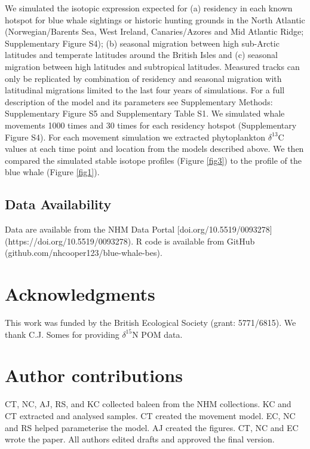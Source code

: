 \documentclass[a4paper,12pt]{article}
\begin{document}
We simulated the isotopic expression expected for (a) residency in each known hotspot for blue whale sightings or historic hunting grounds in the North Atlantic (Norwegian/Barents Sea, West Ireland, Canaries/Azores and Mid Atlantic Ridge\cite{mcdonald2006biogeographic,reilly2008balaenoptera,sigurjonsson1995life}; Supplementary Figure S4); (b) seasonal migration between high sub-Arctic latitudes and temperate latitudes around the British Isles and (c) seasonal migration between high latitudes and subtropical latitudes. 
Measured tracks can only be replicated by combination of residency and seasonal migration with latitudinal migrations limited to the last four years of simulations.
For a full description of the model and its parameters see Supplementary Methods: Supplementary Figure S5 and Supplementary Table S1. 
We simulated whale movements 1000 times and 30 times for each residency hotspot (Supplementary Figure S4). %
For each movement simulation we extracted phytoplankton $\delta^{13}$C values at each time point and location from the models described above\cite{magozzi2017using}. 
We then compared the simulated stable isotope profiles (Figure \ref{fig3}) to the profile of the blue whale (Figure \ref{fig1}).
 
\subsection{Data Availability}
Data are available from the NHM Data Portal [doi.org/10.5519/0093278](https://doi.org/10.5519/0093278). 
R code is available from GitHub (github.com/nhcooper123/blue-whale-bes).
{}





\section{Acknowledgments}
This work was funded by the British Ecological Society (grant: 5771/6815). 
We thank C.J. Somes for providing  $\delta^{15}$N POM data.

\section{Author contributions}
CT, NC, AJ, RS, and KC collected baleen from the NHM collections. 
KC and CT extracted and analysed samples.
CT created the movement model.
EC, NC and RS helped parameterise the model.
AJ created the figures. 
CT, NC and EC wrote the paper.
All authors edited drafts and approved the final version.
\end{document}
